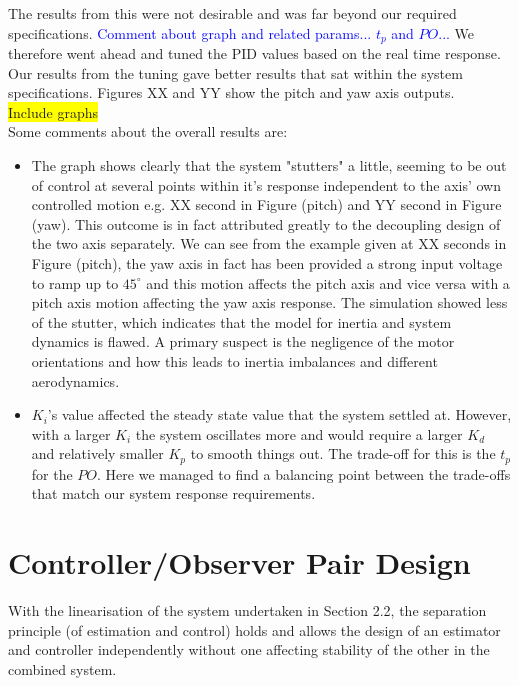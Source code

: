 \documentclass[11pt]{article}
\begin{document}
The results from this were not desirable and was far beyond our required specifications. \textcolor{blue}{Comment about graph and related params... $t_p$ and $PO$...} We therefore went ahead and tuned the PID values based on the real time response. Our results from the tuning gave better results that sat within the system specifications. Figures XX and YY show the pitch and yaw axis outputs.\\
\colorbox{yellow}{Include graphs}\\

Some comments about the overall results are:
\begin{itemize}
    \item %
    The graph shows clearly that the system "stutters" a little, seeming to be out of control at several points within it's response independent to the axis' own controlled motion e.g. XX second in Figure (pitch) and YY second in Figure (yaw). This outcome is in fact attributed greatly to the decoupling design of the two axis separately. We can see from the example given at XX seconds in Figure (pitch), the yaw axis in fact has been provided a strong input voltage to ramp up to $45^\circ$ and this motion affects the pitch axis and vice versa with a pitch axis motion affecting the yaw axis response. The simulation showed less of the stutter, which indicates that the model for inertia and system dynamics is flawed. A primary suspect is the negligence of the motor orientations and how this leads to inertia imbalances and different aerodynamics.
    \item %
    $K_i$'s value affected the steady state value that the system settled at. However, with a larger $K_i$ the system oscillates more and would require a larger $K_d$ and relatively smaller $K_p$ to smooth things out. The trade-off for this is the $t_p$ for the $PO$. Here we managed to find a balancing point between the trade-offs that match our system response requirements.
\end{itemize}

\newpage
\section{Controller/Observer Pair Design}
With the linearisation of the system undertaken in Section 2.2, the separation principle (of estimation and control) holds and allows the design of an estimator and controller independently without one affecting stability of the other in the combined system.
\end{document}

